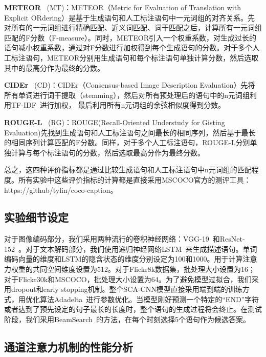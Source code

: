 \textbf{METEOR}~\cite{banerjee2005meteor} (MT)：METEOR（Metric for Evaluation of Translation with Explicit ORdering）是基于生成语句和人工标注语句中一元词组的对齐关系。先对所有的一元词组进行精确匹配、近义词匹配、词干匹配之后，计算所有一元词组匹配的F分数（F-measure）。同时，METEOR引入一个权重系数，对生成过长的语句减小权重系数，通过对F分数进行加权得到每个生成语句的分数。对于多个人工标注语句，METEOR分别用生成语句和每个标注语句单独计算分数，然后选取其中的最高分作为最终的分数。

\textbf{CIDEr}~\cite{vedantam2015cider} (CD)：CIDEr（Consensus-based Image Description Evaluation）先将所有单词进行词干提取（stemming），然后对所有预处理后的语句中的n元词组利用TF-IDF~\cite{robertson2004understanding}进行加权，
最后利用所有n元词组的余弦相似度得到分数。

\textbf{ROUGE-L}~\cite{lin2002manual} (RG)：ROUGE(Recall-Oriented Understudy for Gisting Evaluation)先找到生成语句和人工标注语句之间最长的相同序列，然后基于最长的相同序列计算匹配的F分数。同样，对于多个人工标注语句，ROUGE-L分别单独计算与每个标注语句的分数，然后选取最高分作为最终分数。

总之，这四种评价指标都是通过比较生成语句和人工标注语句中n元词组的匹配程度。所有实验中这些评价指标的计算都是直接采用MSCOCO官方的测评工具：https://github/tylin/coco-caption。


\subsection{实验细节设定}
对于图像编码部分，我们采用两种流行的卷积神经网络：VGG-19~\cite{simonyan2015very}和ResNet-152~\cite{he2016deep}。对于文本解码部分，我们使用递归神经网络LSTM~\cite{hochreiter1997long}来生成描述语句。单词编码向量的维度和LSTM的隐含状态的维度分别设定为100和1000。用于计算注意力权重的共同空间维度设置为512。对于Flickr8k数据集，批处理大小设置为16；对于Flickr30k和MSCOCO，批处理大小设置为64。为了避免模型过拟合，我们采用dropout和early stopping机制。整个SCA-CNN模型直接采用端到端的训练方式，用优化算法Adadelta~\cite{zeiler2012adadelta}进行参数优化。当模型刚好预测一个特定的“END”字符或者达到了预先设定的句子最长的长度时，整个语句的生成过程将会终止。在测试阶段，我们采用BeamSearch~\cite{vinyals2015show}的方法，在每个时刻选择5个语句作为候选答案。


\subsection{通道注意力机制的性能分析}

